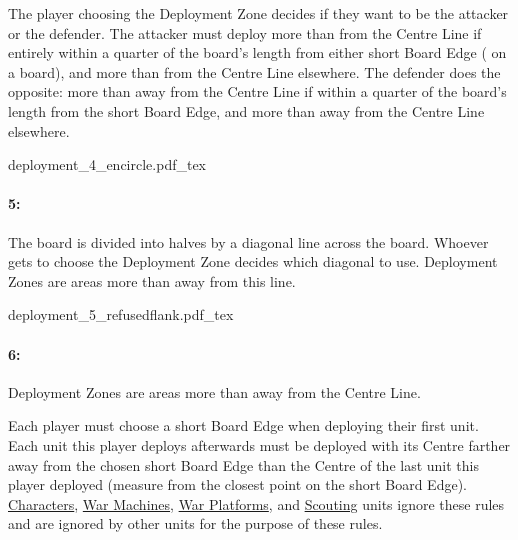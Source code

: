The player choosing the Deployment Zone decides if they want to be the attacker or the defender. The attacker must deploy more than  from the Centre Line if entirely within a quarter of the board's length from either short Board Edge ( on a  board), and more than  from the Centre Line elsewhere. The defender does the opposite: more than  away from the Centre Line if within a quarter of the board's length from the short Board Edge, and more than  away from the Centre Line elsewhere.

\begin{center}
	\def\svgwidth{0.36\textwidth}
	\def\deploymentfigAttacker{Attacker}
	\def\deploymentfigDefender{Defender}
	{deployment_4_encircle.pdf_tex}
\end{center}
\vspace{-3pt}

\hypertarget{refused_flank}{\paragraph{5\spacebeforecolon{}: }}

The board is divided into halves by a diagonal line across the board. Whoever gets to choose the Deployment Zone decides which diagonal to use. Deployment Zones are areas more than  away from this line.

\begin{center}
	\def\svgwidth{0.36\textwidth}
	{deployment_5_refusedflank.pdf_tex}
\end{center}
\vspace{-3pt}

\hypertarget{marching_columns}{\paragraph{6\spacebeforecolon{}: \marchingcolumns}}
\idx[main=y]{\marchingcolumns}

Deployment Zones are areas more than  away from the Centre Line.

Each player must choose a short Board Edge when deploying their first unit. Each unit this player deploys afterwards must be deployed with its Centre farther away from the chosen short Board Edge than the Centre of the last unit this player deployed (measure from the closest point on the short Board Edge). \hyperref[characters]{Characters}, \hyperref[war_machine]{War Machines}, \hyperref[war_platform]{War Platforms}, and \hyperref[scout]{Scouting} units ignore these rules and are ignored by other units for the purpose of these rules.

